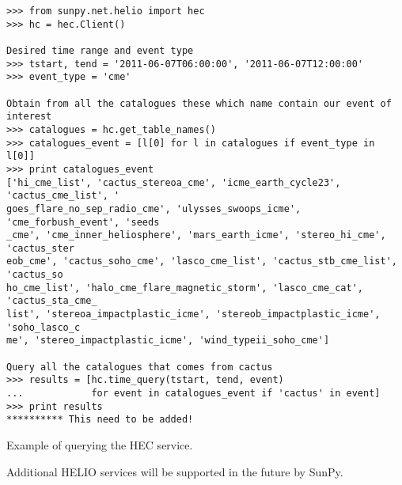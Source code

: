 \begin{listing}[h]
\begin{verbatim}
>>> from sunpy.net.helio import hec
>>> hc = hec.Client()

Desired time range and event type
>>> tstart, tend = '2011-06-07T06:00:00', '2011-06-07T12:00:00'
>>> event_type = 'cme'

Obtain from all the catalogues these which name contain our event of interest
>>> catalogues = hc.get_table_names()
>>> catalogues_event = [l[0] for l in catalogues if event_type in l[0]]
>>> print catalogues_event
['hi_cme_list', 'cactus_stereoa_cme', 'icme_earth_cycle23', 'cactus_cme_list', '
goes_flare_no_sep_radio_cme', 'ulysses_swoops_icme', 'cme_forbush_event', 'seeds
_cme', 'cme_inner_heliosphere', 'mars_earth_icme', 'stereo_hi_cme', 'cactus_ster
eob_cme', 'cactus_soho_cme', 'lasco_cme_list', 'cactus_stb_cme_list', 'cactus_so
ho_cme_list', 'halo_cme_flare_magnetic_storm', 'lasco_cme_cat', 'cactus_sta_cme_
list', 'stereoa_impactplastic_icme', 'stereob_impactplastic_icme', 'soho_lasco_c
me', 'stereo_impactplastic_icme', 'wind_typeii_soho_cme']

Query all the catalogues that comes from cactus
>>> results = [hc.time_query(tstart, tend, event) 
...            for event in catalogues_event if 'cactus' in event]
>>> print results
********** This need to be added!
\end{verbatim}
\caption{Example of querying the HEC service.}
\label{code:helio}
\end{listing}

Additional HELIO services will be supported in the future by SunPy.
